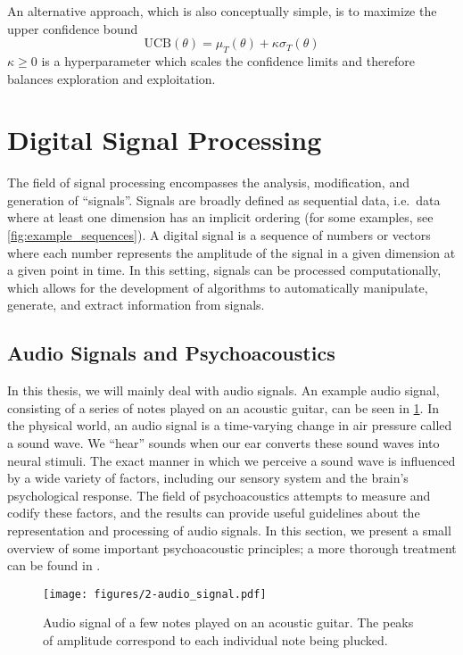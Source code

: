 An alternative approach, which is also conceptually simple, is to maximize the upper confidence bound
\begin{equation}
        \mathrm{UCB}(\theta) = \mu_T(\theta) + \kappa \sigma_T(\theta)
\end{equation}
$\kappa \ge 0$ is a hyperparameter which scales the confidence limits and therefore balances exploration and exploitation.

\section{Digital Signal Processing}

The field of signal processing encompasses the analysis, modification, and generation of ``signals''.
Signals are broadly defined as sequential data, i.e.\ data where at least one dimension has an implicit ordering (for some examples, see \cref{fig:example_sequences}).
A digital signal is a sequence of numbers or vectors where each number represents the amplitude of the signal in a given dimension at a given point in time.
In this setting, signals can be processed computationally, which allows for the development of algorithms to automatically manipulate, generate, and extract information from signals.

\subsection{Audio Signals and Psychoacoustics}
\label{sec:psychoacoustics}

In this thesis, we will mainly deal with audio signals.
An example audio signal, consisting of a series of notes played on an acoustic guitar, can be seen in \cref{fig:audio_signal}.
In the physical world, an audio signal is a time-varying change in air pressure called a sound wave.
We ``hear'' sounds when our ear converts these sound waves into neural stimuli.
The exact manner in which we perceive a sound wave is influenced by a wide variety of factors, including our sensory system and the brain's psychological response.
The field of psychoacoustics attempts to measure and codify these factors, and the results can provide useful guidelines about the representation and processing of audio signals.
In this section, we present a small overview of some important psychoacoustic principles; a more thorough treatment can be found in \cite{cook1999music,bosi2012introduction}.

\begin{figure}
  \centering
  \texttt{[image: figures/2-audio\_signal.pdf]}
  \caption[Audio recording of an acoustic guitar]{Audio signal of a few notes played on an acoustic guitar.
  The peaks of amplitude correspond to each individual note being plucked.}
  \label{fig:audio_signal}
\end{figure}

